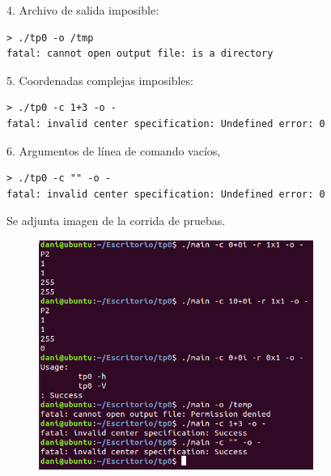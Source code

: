 \documentclass[a4paper,10pt]{article}
\begin{document}
4. Archivo de salida imposible:
\begin{verbatim}
> ./tp0 -o /tmp
fatal: cannot open output file: is a directory
\end{verbatim}


5. Coordenadas complejas imposibles:
\begin{verbatim}
> ./tp0 -c 1+3 -o -
fatal: invalid center specification: Undefined error: 0
\end{verbatim}


6. Argumentos de l\'inea de comando vac\'ios,
\begin{verbatim}
> ./tp0 -c "" -o -
fatal: invalid center specification: Undefined error: 0
\end{verbatim}


Se adjunta imagen de la corrida de pruebas.
\begin{figure}
  \begin{center}
    \includegraphics[width=0.8\textwidth]{./Pruebas.png}
    \label{fig:Resultado de correr los casos de prueba antes mencionados}
    \caption{}
  \end{center}
\end{figure}
\end{document}
